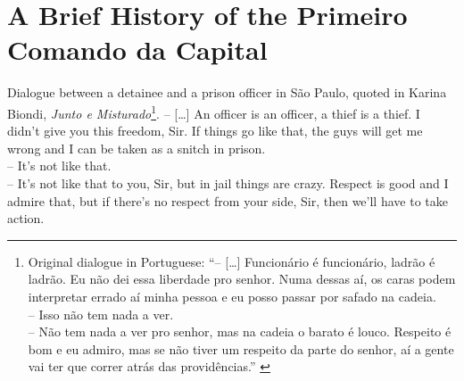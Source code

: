 \chapter{A Brief History of the Primeiro Comando da Capital}
\label{ch:chap3}


\begin{chapquote}{Dialogue between a detainee and a prison officer in S\~{a}o Paulo, quoted in Karina Biondi, \textit{Junto e Misturado}\footnote{Original dialogue in Portuguese: ``-- [\dots] Funcion\'{a}rio \'{e} funcion\'{a}rio, ladr\~{a}o \'{e} ladr\~{a}o. Eu n\~{a}o dei essa liberdade pro senhor. Numa dessas a\'{i}, os caras podem interpretar errado a\'{i} minha pessoa e eu posso passar por safado na cadeia.\\
-- Isso n\~{a}o tem nada a ver.\\
-- N\~{a}o tem nada a ver pro senhor, mas na cadeia o barato \'{e} louco. Respeito \'{e} bom e eu admiro, mas se n\~{a}o tiver um respeito da parte do senhor, a\'{i} a gente vai ter que correr atr\'{a}s das provid\^{e}ncias.'' \citep[84]{biondi2010junto}}.}
-- [\dots] An officer is an officer, a thief is a thief. I didn't give you this freedom, Sir. If things go like that, the guys will get me wrong and I can be taken as a snitch in prison.\\
-- It's not like that.\\
-- It's not like that to you, Sir, but in jail things are crazy. Respect is good and I admire that, but if there's no respect from your side, Sir, then we'll have to take action.
\end{chapquote}


